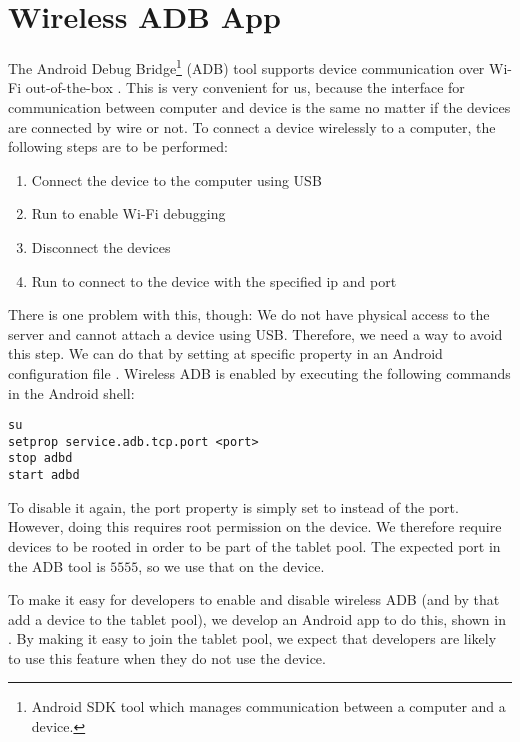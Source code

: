 \section{Wireless ADB App}
The Android Debug Bridge\footnote{Android SDK tool which manages communication between a computer and a device.} (ADB) tool supports device communication over Wi-Fi out-of-the-box \parencite{AndroidADB}. This is very convenient for us, because the interface for communication between computer and device is the same no matter if the devices are connected by wire or not. To connect a device wirelessly to a computer, the following steps are to be performed:
\begin{enumerate}
  \item Connect the device to the computer using USB
  \item Run  to enable Wi-Fi debugging
  \item Disconnect the devices
  \item Run  to connect to the device with the specified ip and port
\end{enumerate}
There is one problem with this, though: We do not have physical access to the server and cannot attach a device using USB\@. Therefore, we need a way to avoid this step. We can do that by setting at specific property in an Android configuration file \parencite{stackoverflow-adb-tcp}. Wireless ADB is enabled by executing the following commands in the Android shell:
\begin{lstlisting}
su
setprop service.adb.tcp.port <port>
stop adbd
start adbd
\end{lstlisting}
To disable it again, the port property is simply set to  instead of the port. However, doing this requires root permission on the device. We therefore require devices to be rooted in order to be part of the tablet pool. The expected port in the ADB tool is $5555$, so we use that on the device.

To make it easy for developers to enable and disable wireless ADB (and by that add a device to the tablet pool), we develop an Android app to do this, shown in . By making it easy to join the tablet pool, we expect that developers are likely to use this feature when they do not use the device.


